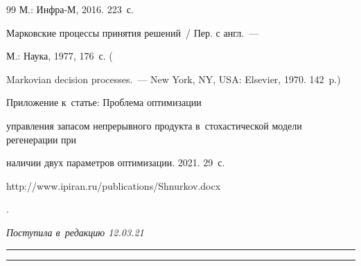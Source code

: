 {{\begin{thebibliography}{99}
М.: Инфра-М, 2016. 223~с.


   Марковские процессы принятия решений~/ Пер. с англ.~--- 

 М.: Наука, 1977, 176~с. (  

 {Markovian decision processes}.~--- New York, NY, USA: Elsevier, 1970. 142~p.)


   Приложение к~статье: Проб\-ле\-ма оптимизации 

управления запасом непрерывного продукта в~стохастической модели регенерации при 

наличии двух параметров оптимизации. 2021. 29~с. {\sf 

http://www.ipiran.ru/publications/Shnurkov.docx}.

  \end{thebibliography}

} }







\vspace*{-3pt}



\hfill{\small\textit{Поступила в~редакцию 12.03.21}}



\vspace*{6pt}



\hrule



\vspace*{2pt}









\hrule






\def\tit{INVESTIGATION OF~THE~PROBLEM OF~CONTINUOUS PRODUCT STOCK CONTROL 

IN~A~STOCHASTIC MODEL OF~REGENERATION WITH~TWO OPTIMIZATION PARAMETERS}





